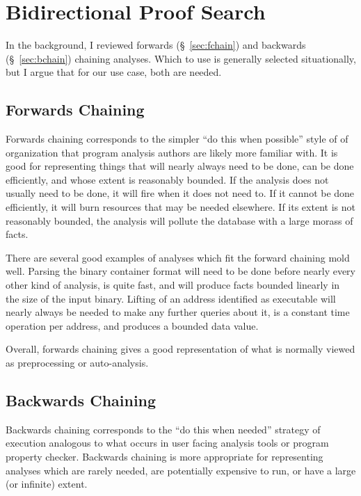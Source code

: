 \section{Bidirectional Proof Search}
\label{sec:bidisearch}
In the background, I reviewed forwards (\S~\ref{sec:fchain}) and backwards (\S~\ref{sec:bchain}) chaining analyses.
Which to use is generally selected situationally, but I argue that for our use case, both are needed.
\subsection{Forwards Chaining}
Forwards chaining corresponds to the simpler ``do this when possible'' style of of organization that program analysis authors are likely more familiar with.
It is good for representing things that will nearly always need to be done,
can be done efficiently,
and whose extent is reasonably bounded.
If the analysis does not usually need to be done, it will fire when it does not need to.
If it cannot be done efficiently, it will burn resources that may be needed elsewhere.
If its extent is not reasonably bounded, the analysis will pollute the database with a large morass of facts.

There are several good examples of analyses which fit the forward chaining mold well.
Parsing the binary container format will need to be done before nearly every other kind of analysis, is quite fast, and will produce facts bounded linearly in the size of the input binary.
Lifting of an address identified as executable will nearly always be needed to make any further queries about it, is a constant time operation per address, and produces a bounded data value.

Overall, forwards chaining gives a good representation of what is normally viewed as preprocessing or auto-analysis.

\subsection{Backwards Chaining}
Backwards chaining corresponds to the ``do this when needed'' strategy of execution analogous to what occurs in user facing analysis tools or program property checker.
Backwards chaining is more appropriate for representing analyses which
are rarely needed,
are potentially expensive to run,
or have a large (or infinite) extent.

